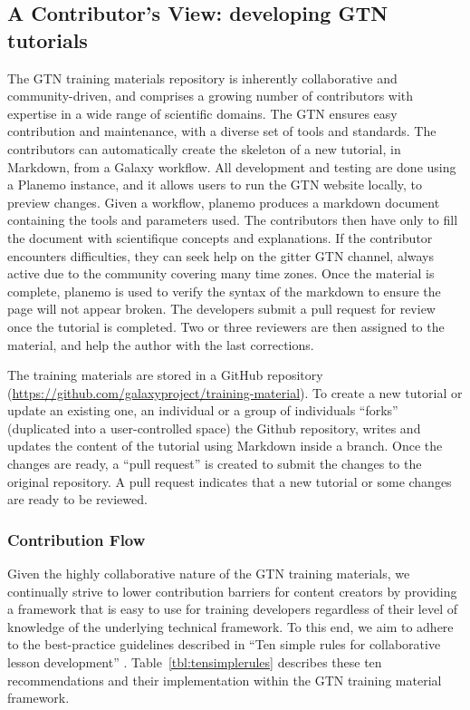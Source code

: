 \documentclass[10pt,letterpaper]{article}
\begin{document}
\subsection*{A Contributor's View: developing GTN tutorials}

The GTN training materials repository is inherently collaborative and community-driven, and comprises a growing number of contributors with expertise in a wide range of scientific domains.
The GTN ensures easy contribution and maintenance, with a diverse set of tools and standards.
The contributors can automatically create the skeleton of a new tutorial, in Markdown, from a Galaxy workflow.
All development and testing are done using a Planemo instance, and it allows users to run the GTN website locally, to preview changes.
Given a workflow, planemo produces a markdown document containing the tools and parameters used.
The contributors then have only to fill the document with scientifique concepts and explanations.
If the contributor encounters difficulties, they can seek help on the gitter GTN channel, always active due to the community covering many time zones.
Once the material is complete, planemo is used to verify the syntax of the markdown to ensure the page will not appear broken.
The developers submit a pull request for review once the tutorial is completed.
Two or three reviewers are then assigned to the material, and help the author with the last corrections.


The training materials are stored in a GitHub repository (\url{https://github.com/galaxyproject/training-material}).
To create a new tutorial or update an existing one, an individual or a group of individuals “forks” (duplicated into a user-controlled space) the Github repository, writes and updates the content of the tutorial using Markdown inside a branch.
Once the changes are ready, a “pull request” is created to submit the changes to the original repository.
A pull request indicates that a new tutorial or some changes are ready to be reviewed.

\subsubsection*{Contribution Flow}
Given the highly collaborative nature of the GTN training materials, we continually strive to lower contribution barriers for content creators by providing a framework that is easy to use for training developers regardless of their level of knowledge of the underlying technical framework.
To this end, we aim to adhere to the best-practice guidelines described in  “Ten simple rules for collaborative lesson development” \cite{TODO}.
Table~\ref{tbl:tensimplerules} describes these ten recommendations and their implementation within the GTN training material framework.
\end{document}
